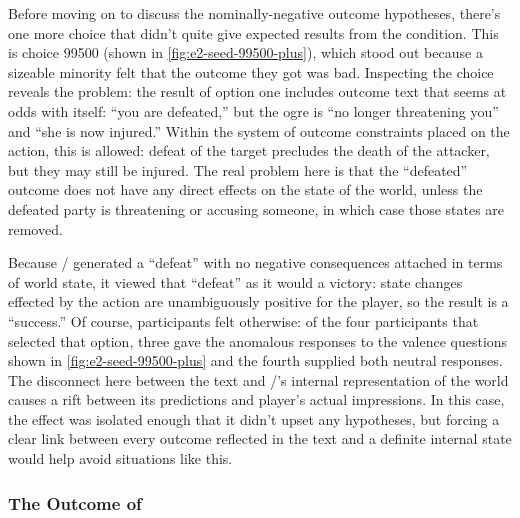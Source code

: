 Before moving on to discuss the nominally-negative outcome hypotheses, there's one more choice that didn't quite give expected results from the \unxs{} condition.
%
This is choice 99500 (shown in \cref{fig:e2-seed-99500-plus}), which stood out because a sizeable minority felt that the outcome they got was bad.
%
Inspecting the choice reveals the problem: the result of option one includes outcome text that seems at odds with itself: ``you are defeated,'' but the ogre is ``no longer threatening you'' and ``she is now injured.''
%
Within the system of outcome constraints placed on the  action, this is allowed: defeat of the target precludes the death of the attacker, but they may still be injured.
%
The real problem here is that the ``defeated'' outcome does not have any direct effects on the state of the world, unless the defeated party is threatening or accusing someone, in which case those states are removed.


Because \dunyazad/ generated a ``defeat'' with no negative consequences attached in terms of world state, it viewed that ``defeat'' as it would a victory: state changes effected by the action are unambiguously positive for the player, so the result is a ``success.''
%
Of course, participants felt otherwise: of the four participants that selected that option, three gave the anomalous responses to the valence questions shown in \cref{fig:e2-seed-99500-plus} and the fourth supplied both neutral responses.
%
The disconnect here between the text and \dunyazad/'s internal representation of the world causes a rift between its predictions and player's actual impressions.
%
In this case, the effect was isolated enough that it didn't upset any hypotheses, but forcing a clear link between every outcome reflected in the text and a definite internal state would help avoid situations like this.


\subsubsection{The Outcome of }

